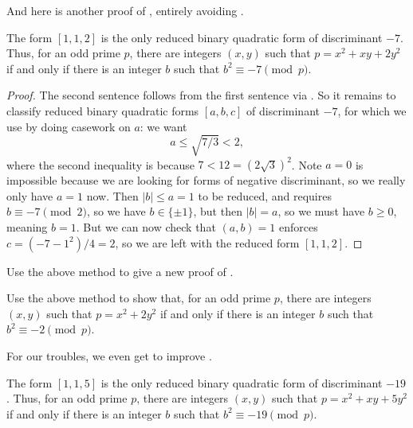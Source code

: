 \documentclass[../notes.tex]{subfiles}
\begin{document}
And here is another proof of , entirely avoiding .
\begin{example}
	The form $[1,1,2]$ is the only reduced binary quadratic form of discriminant $-7$. Thus, for an odd prime $p$, there are integers $(x,y)$ such that $p=x^2+xy+2y^2$ if and only if there is an integer $b$ such that $b^2\equiv-7\pmod p$.
\end{example}
\begin{proof}
	The second sentence follows from the first sentence via . So it remains to classify reduced binary quadratic forms $[a,b,c]$ of discriminant $-7$, for which we use  by doing casework on $a$: we want
	\[a\le\sqrt{7/3}<2,\]
	where the second inequality is because $7<12=(2\sqrt3)^2$. Note $a=0$ is impossible because we are looking for forms of negative discriminant, so we really only have $a=1$ now. Then $\left|b\right|\le a=1$ to be reduced, and  requires $b\equiv-7\pmod2$, so we have $b\in\{\pm1\}$, but then $\left|b\right|=a$, so we must have $b\ge0$, meaning $b=1$. But we can now check that $(a,b)=1$ enforces $c=\left(-7-1^2\right)/4=2$, so we are left with the reduced form $[1,1,2]$.
\end{proof}
\begin{exercise}
	Use the above method to give a new proof of .
\end{exercise}
\begin{exercise} \label{exe:primes-of-form-2}
	Use the above method to show that, for an odd prime $p$, there are integers $(x,y)$ such that $p=x^2+2y^2$ if and only if there is an integer $b$ such that $b^2\equiv-2\pmod p$.
\end{exercise}
For our troubles, we even get to improve .
\begin{example}
	The form $[1,1,5]$ is the only reduced binary quadratic form of discriminant $-19$. Thus, for an odd prime $p$, there are integers $(x,y)$ such that $p=x^2+xy+5y^2$ if and only if there is an integer $b$ such that $b^2\equiv-19\pmod p$.
\end{example}
\end{document}
